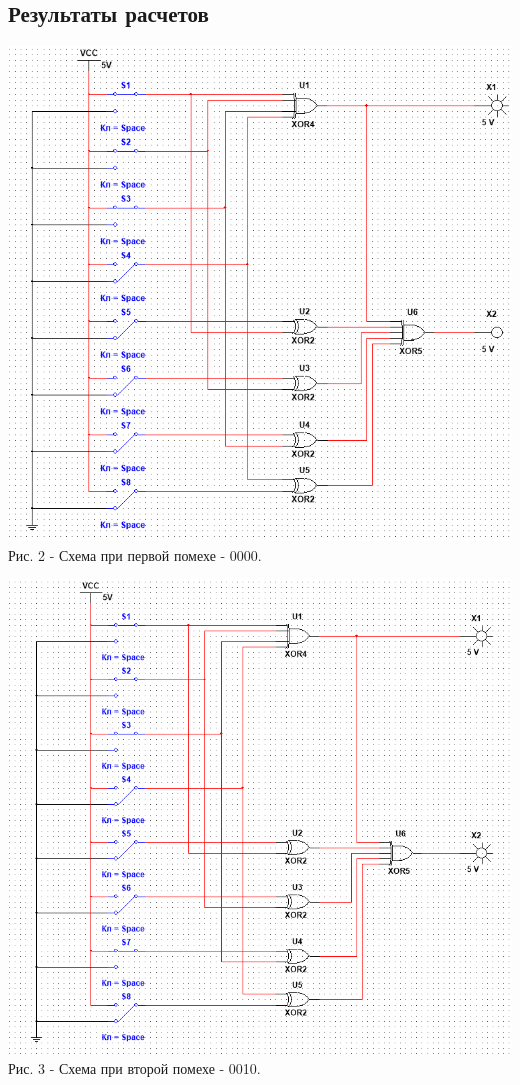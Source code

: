 \documentclass[11pt]{article}
\begin{document}
\subsection{Результаты расчетов}
\begin{center}
    \includegraphics[width=1\linewidth]{img/scheme1.png}
    Рис. 2 - Схема при первой помехе - 0000.
\end{center}

\begin{center}
    \includegraphics[width=1\linewidth]{img/pomeha2.png}
    Рис. 3 - Схема при второй помехе - 0010.
\end{center}
\end{document}
